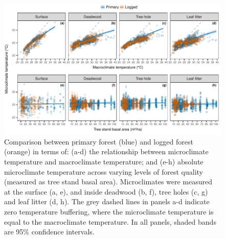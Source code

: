 \documentclass[12pt,a4paper,]{report}
\theoremstyle{definition}
\theoremstyle{definition}
\theoremstyle{definition}
\theoremstyle{remark}
\begin{document}
\begin{figure}

{\centering \includegraphics{./output/fig-4-3-1} 

}

\caption{Comparison between primary forest (blue) and logged forest (orange) in terms of: (a-d) the relationship between microclimate temperature and macroclimate temperature; and (e-h) absolute microclimate temperature across varying levels of forest quality (measured as tree stand basal area). Microclimates were measured at the surface (a, e), and inside deadwood (b, f), tree holes (c, g)  and leaf litter (d, h). The grey dashed lines in panels a-d indicate zero temperature buffering, where the microclimate temperature is equal to the macroclimate temperature. In all panels, shaded bands are 95\% confidence intervals.}\label{fig:fig-4-3}
\end{figure}
\end{document}
